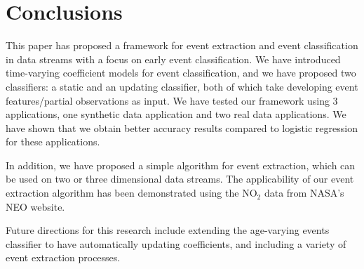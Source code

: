 \documentclass[a4paper,11pt]{article}
\begin{document}
\section{Conclusions}\label{sec:Conclusions}

This paper has proposed a framework for event extraction and event classification in data streams with a focus on early event classification. We have introduced  time-varying coefficient models for event classification, and we have proposed two classifiers: a static and an updating classifier, both of which take developing event features/partial observations as input. We have tested our framework using 3 applications, one synthetic data application and two real data applications. We have shown that we obtain better accuracy results compared to logistic regression for these applications.

In addition, we have proposed a simple algorithm for event extraction, which can be used on two or three dimensional data streams. The applicability of our event extraction algorithm has been demonstrated using the $\text{NO}_2$ data from NASA's NEO website.

Future directions for this research include extending the age-varying events classifier to have automatically updating coefficients, and including a variety of event extraction processes.

\end{document}
